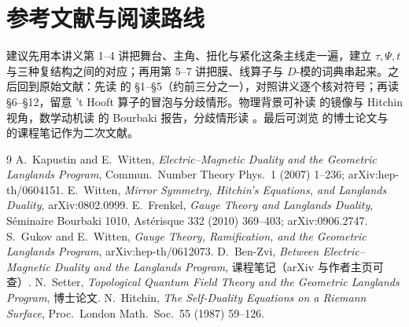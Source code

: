 \section{参考文献与阅读路线}

建议先用本讲义第 1--4 讲把舞台、主角、扭化与紧化这条主线走一遍，建立 $\tau,\Psi,t$ 与三种复结构之间的对应；再用第 5--7 讲把膜、线算子与 $D$-模的词典串起来。之后回到原始文献：先读 \cite{kw06} 的 \S1--\S5（约前三分之一），对照讲义逐个核对符号；再读 \S6--\S12，留意 't Hooft 算子的冒泡与分歧情形。物理背景可补读 \cite{w08} 的镜像与 Hitchin 视角，数学动机读 \cite{fr09} 的 Bourbaki 报告，分歧情形读 \cite{gw06}。最后可浏览 \cite{set13} 的博士论文与 \cite{bz04} 的课程笔记作为二次文献。

\begin{thebibliography}{9}
 A.~Kapustin and E.~Witten, \emph{Electric--Magnetic Duality and the Geometric Langlands Program}, Commun.\ Number Theory Phys.\ 1 (2007) 1--236; arXiv:hep-th/0604151.
 E.~Witten, \emph{Mirror Symmetry, Hitchin's Equations, and Langlands Duality}, arXiv:0802.0999.
 E.~Frenkel, \emph{Gauge Theory and Langlands Duality}, S\'eminaire Bourbaki 1010, Ast\'erisque 332 (2010) 369--403; arXiv:0906.2747.
 S.~Gukov and E.~Witten, \emph{Gauge Theory, Ramification, and the Geometric Langlands Program}, arXiv:hep-th/0612073.
 D.~Ben-Zvi, \emph{Between Electric--Magnetic Duality and the Langlands Program}, 课程笔记（arXiv 与作者主页可查）.
 N.~Setter, \emph{Topological Quantum Field Theory and the Geometric Langlands Program}, 博士论文.
 N.~Hitchin, \emph{The Self-Duality Equations on a Riemann Surface}, Proc.\ London Math.\ Soc.\ 55 (1987) 59--126.
\end{thebibliography}
